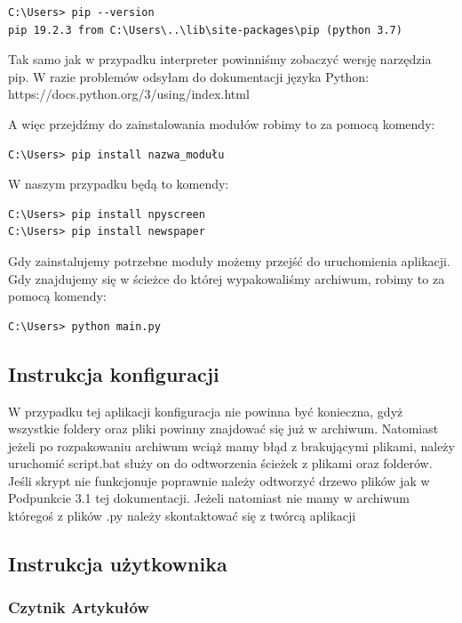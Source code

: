 \documentclass{article}
\begin{document}
\begin{verbatim}
C:\Users> pip --version
pip 19.2.3 from C:\Users\..\lib\site-packages\pip (python 3.7)
\end{verbatim}

Tak samo jak w przypadku interpreter powinniśmy zobaczyć wersję narzędzia pip. W razie problemów odsyłam do dokumentacji języka Python:\\ 
https://docs.python.org/3/using/index.html

A więc przejdźmy do zainstalowania modułów robimy to za pomocą komendy:

\begin{verbatim}
C:\Users> pip install nazwa_modułu
\end{verbatim}

W naszym przypadku będą to komendy:
\begin{verbatim}
C:\Users> pip install npyscreen
C:\Users> pip install newspaper
\end{verbatim}

Gdy zainstalujemy potrzebne moduły możemy przejść do uruchomienia aplikacji. 
Gdy znajdujemy się w ścieżce do której wypakowaliśmy archiwum, robimy to za pomocą komendy:

\begin{verbatim}
C:\Users> python main.py
\end{verbatim}


\subsection{Instrukcja konfiguracji}

W przypadku tej aplikacji konfiguracja nie powinna być konieczna, gdyż wszystkie foldery oraz pliki powinny znajdować się już w archiwum.
Natomiast jeżeli po rozpakowaniu archiwum wciąż mamy błąd z brakującymi plikami, należy uruchomić script.bat służy on do odtworzenia ścieżek z plikami oraz folderów.
Jeśli skrypt nie funkcjonuje poprawnie należy odtworzyć drzewo plików jak w Podpunkcie 3.1 tej dokumentacji.
Jeżeli natomiast nie mamy w archiwum któregoś z plików .py należy skontaktować się z twórcą aplikacji 

\pagebreak

\subsection{Instrukcja użytkownika}

\subsubsection{Czytnik Artykułów}
\end{document}
